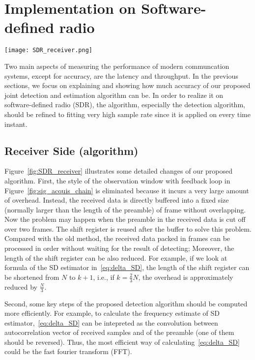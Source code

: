 \section{Implementation on Software-defined radio}
\label{sec:real_implementation}

\begin{figure*}[t]
  \centerline{\texttt{[image: SDR\_receiver.png]}}
  \caption{Block diagram for implementing the proposed algorithm on software-defined radio (some steps are omitted)}
  \label{fig:SDR_receiver}
  \end{figure*}

Two main aspects of measuring the performance of modern communcation systems, except for accuracy,
are the latency and throughput. In the previous sections, we focus on explaining and showing
how much accuracy of our proposed joint detection and estimation algorithm can be.
In order to realize it on software-defined radio (SDR), the algorithm, especially the detection algorithm, should be refined
to fitting very high sample rate since it is applied on every time instant.

\subsection{Receiver Side (algorithm)}

Figure~\ref{fig:SDR_receiver} illustrates some detailed changes of our proposed algorithm.
First, the style of the observation window with feedback loop in Figure~\ref{fig:sig_acquis_chain} is eliminated
because it incurs a very large amount of overhead. Instead, the received data is directly buffered into 
a fixed size (normally larger than the length of the preamble) of frame without overlapping. Now
the problem may happen when the preamble in the received data is cut off over two frames. 
The shift register is reused after the buffer to solve this problem. Compared with the old method, the received data packed in frames can be processed in order without
waiting for the result of detecting; Moreover, the length of the shift register can be also reduced. 
For example, if we look at formula of the SD estimator in~\eqref{eq:delta_SD}, the length of the shift register can be shortened from $N$ to $k+1$,
i.e., if $k=\frac{2}{3}N$, the overhead is approximately reduced by $\frac{N}{3}$.

Second, some key steps of the proposed detection algorithm should be computed more efficiently.
For example, to calculate the frequency estimate of SD estimator,~\eqref{eq:delta_SD} can be intepreted as the convolution between autocorrelation vector of received samples and of the preamble (one of them should be reversed). 
Thus, the most efficient way of calculating~\eqref{eq:delta_SD} could be the fast fourier transform (FFT). 

